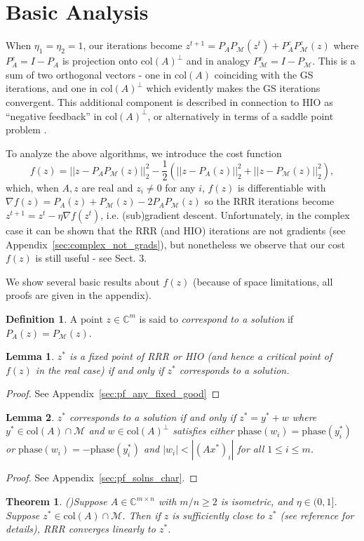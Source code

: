 \documentclass[12pt]{article}
\newtheorem{theorem}{Theorem}
\newtheorem{lemma}{Lemma}
\theoremstyle{definition}
\newtheorem{definition}{Definition}
\theoremstyle{remark}
\theoremstyle{definition}
\theoremstyle{problem}
\theoremstyle{definition}
\newcommand{\bthm}{\begin{theorem}}
\newcommand{\ethm}{\end{theorem}}
\newcommand{\blem}{\begin{lemma}}
\newcommand{\elem}{\end{lemma}}
\newcommand{\bpof}{\begin{proof}}
\newcommand{\epof}{\end{proof}}
\newcommand{\bdefn}{\begin{definition}}
\newcommand{\edefn}{\end{definition}}
\newcommand{\col}{\text{col}}
\newcommand{\CC}{\mathbb{C}}
\newcommand{\MM}{\mathcal{M}}
\begin{document}
\section{Basic Analysis}

When $\eta_1 = \eta_2=1$, our iterations become $z^{t+1} = P_AP_{\MM}(z^t) + P_A^cP_{\MM}^c(z)$ where $P_A^c=I-P_A$ is projection onto $\col(A)^{\perp}$ and in analogy $P_{\MM}^c=I-P_{\MM}$. This is a sum of two orthogonal vectors - one in $\col(A)$ coinciding with the GS iterations, and one in $\col(A)^{\perp}$ which evidently makes the GS iterations convergent. This additional component is described in connection to HIO as ``negative feedback'' in $\col(A)^{\perp}$, or alternatively in terms of a saddle point problem \cite{Marchesini2007}.


To analyze the above algorithms, we introduce the cost function
\[ f(z) = ||z - P_AP_{\MM}(z)||_2^2 - \frac{1}{2}\left(||z-P_{A}(z)||_2^2 + ||z-P_{\MM}(z)||_2^2\right),\]
which, when $A,z$ are real and $z_i\neq 0$ for any $i$, $f(z)$ is differentiable with $\nabla f(z) = P_A(z)+P_{\MM}(z)-2P_AP_{\MM}(z)$ so the RRR iterations become $z^{t+1} = z^t - \eta\nabla f(z^t)$, i.e. (sub)gradient descent. Unfortunately, in the complex case it can be shown that the RRR (and HIO) iterations are not gradients (see Appendix~\ref{sec:complex_not_grads}), but nonetheless we observe that our cost $f(z)$ is still useful - see Sect. 3.

We show several basic results about $f(z)$ (because of space limitations, all proofs are given in the appendix).

\bdefn\label{defn:soln} A point $z\in\CC^m$ is said to \emph{correspond to a solution} if $P_A(z) = P_{\MM}(z)$. \edefn

\blem\label{lem:any_fixed_is_good} $z^*$ is a fixed point of RRR or HIO (and hence a critical point of $f(z)$ in the real case) if and only if $z^*$ corresponds to a solution. \elem
\bpof See Appendix~\ref{sec:pf_any_fixed_good} \epof

\blem\label{lem:solns_char} $z^*$ corresponds to a solution if and only if $z^* = y^* + w$ where $y^*\in\col(A)\cap \MM$ and $w\in\col(A)^{\perp}$ satisfies either $\text{phase}(w_i) = \text{phase}(y^*_i)$ or $\text{phase}(w_i) = -\text{phase}(y^*_i)$ and $|w_i|<|(Ax^*)_i|$ for all $1\leq i\leq m$. \elem
\bpof  See Appendix~\ref{sec:pf_solns_char}. \epof

\bthm\emph{(\cite[Thm. 3]{Li2017a})}\label{lem:lin_conver} Suppose $A\in\CC^{m\times n}$ with $m/n\geq 2$ is isometric, and $\eta\in(0,1]$. Suppose $z^*\in\col(A)\cap\MM$. Then if $z$ is sufficiently close to $z^*$ (see reference for details), RRR converges linearly to $z^*$. \ethm
\end{document}
